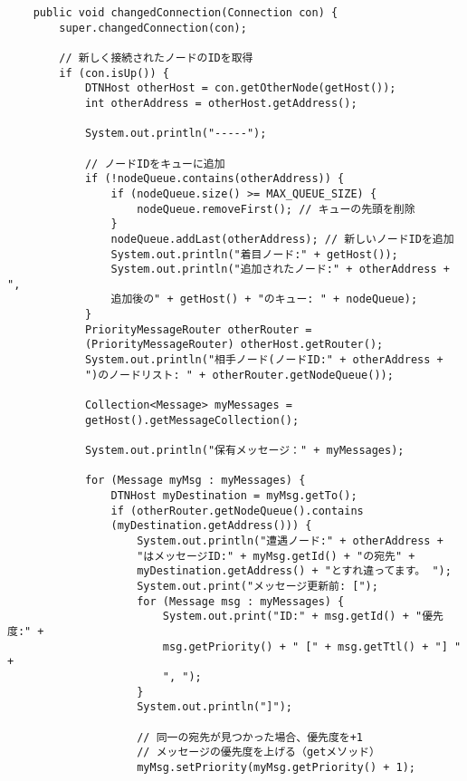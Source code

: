 \documentclass[11pt]{icsthesis}
\begin{document}
\begin{framed}
\begin{verbatim}
    public void changedConnection(Connection con) {
        super.changedConnection(con);
        
        // 新しく接続されたノードのIDを取得
        if (con.isUp()) {
            DTNHost otherHost = con.getOtherNode(getHost());
            int otherAddress = otherHost.getAddress();
            
            System.out.println("-----");
            
            // ノードIDをキューに追加
            if (!nodeQueue.contains(otherAddress)) {
                if (nodeQueue.size() >= MAX_QUEUE_SIZE) {
                    nodeQueue.removeFirst(); // キューの先頭を削除
                }
                nodeQueue.addLast(otherAddress); // 新しいノードIDを追加
                System.out.println("着目ノード:" + getHost());
                System.out.println("追加されたノード:" + otherAddress + ", 
                追加後の" + getHost() + "のキュー: " + nodeQueue);
            }
            PriorityMessageRouter otherRouter = 
            (PriorityMessageRouter) otherHost.getRouter();
            System.out.println("相手ノード(ノードID:" + otherAddress + 
            ")のノードリスト: " + otherRouter.getNodeQueue());
      
            Collection<Message> myMessages = 
            getHost().getMessageCollection();
            
            System.out.println("保有メッセージ：" + myMessages);

            for (Message myMsg : myMessages) {
                DTNHost myDestination = myMsg.getTo();
                if (otherRouter.getNodeQueue().contains
                (myDestination.getAddress())) {
                    System.out.println("遭遇ノード:" + otherAddress + 
                    "はメッセージID:" + myMsg.getId() + "の宛先" + 
                    myDestination.getAddress() + "とすれ違ってます。 ");
                    System.out.print("メッセージ更新前: [");
                    for (Message msg : myMessages) {
                        System.out.print("ID:" + msg.getId() + "優先度:" + 
                        msg.getPriority() + " [" + msg.getTtl() + "] " + 
                        ", ");
                    }
                    System.out.println("]");

                    // 同一の宛先が見つかった場合、優先度を+1
                    // メッセージの優先度を上げる（getメソッド）
                    myMsg.setPriority(myMsg.getPriority() + 1);
                    

\end{verbatim}
\end{framed}
\end{document}
